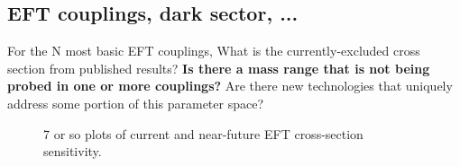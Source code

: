 \subsection{EFT couplings, dark sector, ...}
For the N most basic EFT couplings, What is the currently-excluded cross section from published results?  \textbf{Is there a mass range that is not being probed in one or more couplings?} Are there new technologies that uniquely address some portion of this parameter space?

\begin{figure}
    \centering
    \caption{7 or so plots of current and near-future EFT cross-section sensitivity.}
    \label{fig:EFT_sensitivity}
\end{figure}


